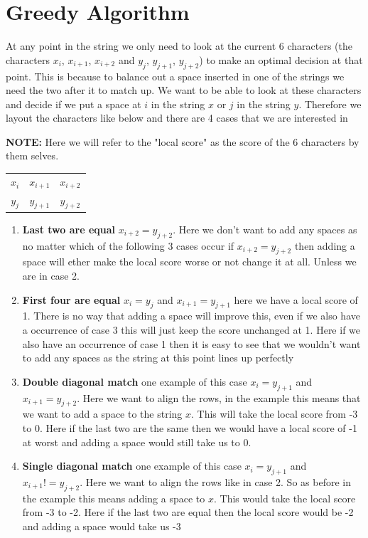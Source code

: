 \documentclass{article}
\begin{document}
  	\section{Greedy Algorithm}
  		At any point in the string we only need to look at the current 6 characters (the characters $x_i$, $x_{i+1}$, $x_{i+2}$ and $y_j$, $y_{j+1}$, $y_{j+2}$) to make an optimal decision at that point. This is because to balance out a space inserted in one of the strings we need the two after it to match up. We want to be able to look at these characters and decide if we put a space at $i$ in the string $x$ or $j$ in the string $y$. Therefore we layout the characters like below and there are 4 cases that we are interested in\newline\newline
  		
  		\textbf{NOTE:} Here we will refer to the "local score" as the score of the 6 characters by them selves.
  		
  		\begin{center}
  			\begin{tabular}{ c c c }
  				$x_i$ & $x_{i+1}$ & $x_{i+2}$\\
  				$y_j$ & $y_{j+1}$ & $y_{j+2}$\\
  			\end{tabular}
  		\end{center}
		
		\begin{enumerate}
		
			\item \textbf{Last two are equal} $x_{i+2} = y_{j+2}$. Here we don't want to add any spaces as no matter which of the following 3 cases occur if $x_{i+2} = y_{j+2}$ then adding a space will ether make the local score worse or not change it at all. Unless we are in case 2. 
			
			\item \textbf{First four are equal} $x_i = y_j$ and $x_{i+1} = y_{j+1}$	here we have a local score of 1. There is no way that adding a space will improve this, even if we also have a occurrence of case 3 this will just keep the score unchanged at 1. Here if we also have an occurrence of case 1 then it is easy to see that we wouldn't want to add any spaces as the string at this point lines up perfectly
			
			\item \textbf{Double diagonal match} one example of this case $x_i = y_{j+1}$ and $x_{i+1} = y_{j+2}$. Here we want to align the rows, in the example this means that we want to add a space to the string $x$. This will take the local score from -3 to 0. Here if the last two are the same then we would have a local score of -1 at worst and adding a space would still take us to 0.
			
			\item \textbf{Single diagonal match} one example of this case $x_i = y_{j+1}$ and $x_{i+1} != y_{j+2}$. Here we want to align the rows like in case 2. So as before in the example this means adding a space to $x$. This would take the local score from -3 to -2. Here if the last two are equal then the local score would be -2 and adding a space would take us -3 
		\end{enumerate}
	
\end{document}
